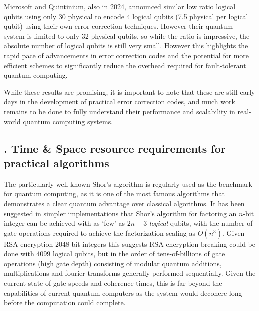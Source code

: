 \documentclass{elbioimp2}
\begin{document}
Microsoft and Quintinium, also in 2024, announced similar low ratio logical qubits using only 30 physical to encode 4 logical qubits (7.5 physical per logical qubit) using their own error correction techniques. However their quantum system is limited to only 32 physical qubits, so while the ratio is impressive, the absolute number of logical qubits is still very small\cite{https://www.microsoft.com/en-us/research/blog/microsoft-and-quintinium-collaborate-to-demonstrate-quantum-error-correction-on-a-32-qubit-topological-quantum-computer/}. However this highlights the rapid pace of advancements in error correction codes and the potential for more efficient schemes to significantly reduce the overhead required for fault-tolerant quantum computing.

While these results are promising, it is important to note that these are still early days in the development of practical error correction codes, and much work remains to be done to fully understand their performance and scalability in real-world quantum computing systems.

\subsection{. Time \& Space resource requirements for practical algorithms}
The particularly well known Shor’s algorithm is regularly used as the benchmark for quantum computing, as it is one of the most famous algorithms that demonstrates a clear quantum advantage over classical algorithms. It has been suggested in simpler implementations that Shor's algorithm for factoring an $n$-bit integer can be achieved with as `few' as $2n+3$ \textit{logical} qubits, with the number of gate operations required to achieve the factorization scaling as $O(n^3)$\cite{https://arxiv.org/abs/quant-ph/0205095}. Given RSA encryption 2048-bit integers this suggests RSA encryption breaking could be done with 4099 logical qubits, but in the order of tens-of-billions of gate operations (high gate depth) consisting of modular quantum additions, multiplications and fourier transforms generally performed sequentially. Given the current state of gate speeds and coherence times, this is far beyond the capabilities of current quantum computers as the system would decohere long before the computation could complete.
\end{document}
